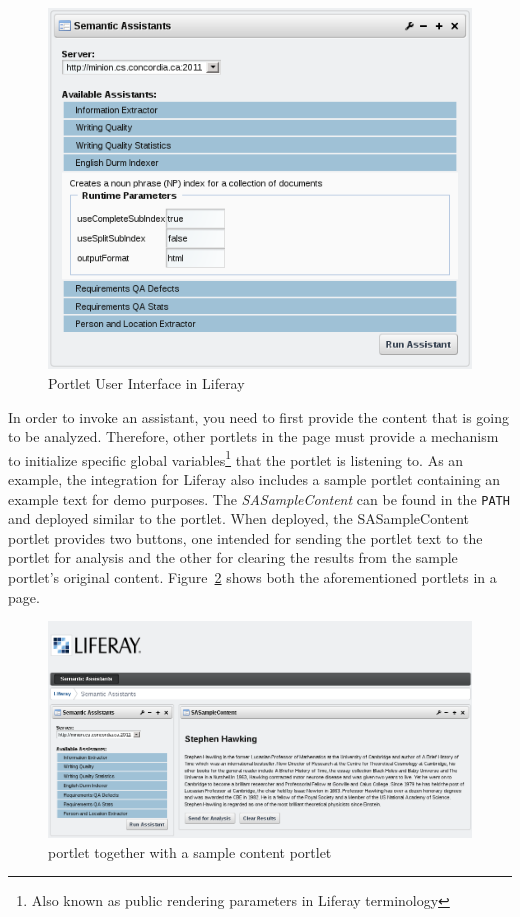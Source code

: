 \begin{figure}
\centering
\includegraphics[scale=0.6]{pictures/liferay_sa_portlet.png}
\caption{\sa Portlet User Interface in Liferay}
\label{fig:liferay_sa_portlet}
\end{figure}

\blankline

In order to invoke an assistant, you need to first provide the content that is going to be analyzed. Therefore, other portlets in the page must provide a mechanism to initialize specific global variables\footnote{Also known as public rendering parameters in Liferay terminology} that the \sa portlet is listening to. As an example, the \sa integration for Liferay also includes a sample portlet containing an example text for demo purposes. The \emph{SASampleContent} can be found in the \texttt{PATH} and deployed similar to the \sa portlet. When deployed, the SASampleContent portlet provides two buttons, one intended for sending the portlet text to the \sa portlet for analysis and the other for clearing the results from the sample portlet's original content. Figure~\ref{fig:liferay_both_portlets} shows both the aforementioned portlets in a page.

\begin{figure}
\centering
\includegraphics[scale=0.6]{pictures/liferay_both_portlets.png}
\caption{\sa portlet together with a sample content portlet}
\label{fig:liferay_both_portlets}
\end{figure}

